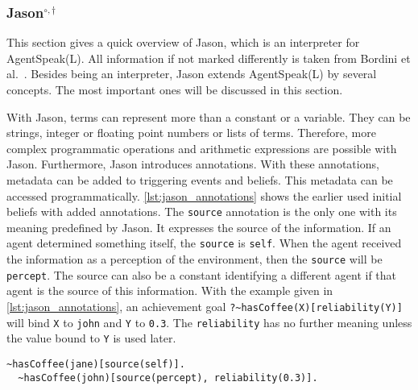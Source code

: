 \subsubsection[Jason]{Jason$^{\circ,\dagger}$}\label{fun:apl_jason}
This section gives a quick overview of Jason, which is an interpreter for AgentSpeak(L).
All information if not marked differently is taken from Bordini et al.~\cite{bordini_jason_2005}.
Besides being an interpreter, Jason extends AgentSpeak(L) by several concepts.
The most important ones will be discussed in this section.

With Jason, terms can represent more than a constant or a variable.
They can be strings, integer or floating point numbers or lists of terms.
Therefore, more complex programmatic operations and arithmetic expressions are possible with Jason.
Furthermore, Jason introduces annotations.
With these annotations, metadata can be added to triggering events and beliefs.
This metadata can be accessed programmatically.
\autoref{lst:jason_annotations} shows the earlier used initial beliefs with added annotations.
The \texttt{source} annotation is the only one with its meaning predefined by Jason.
It expresses the source of the information.
If an agent determined something itself, the \texttt{source} is \texttt{self}.
When the agent received the information as a perception of the environment, then the \texttt{source} will be \texttt{percept}.
The source can also be a constant identifying a different agent if that agent is the source of this information.
With the example given in \autoref{lst:jason_annotations}, an achievement goal \texttt{?\~{}hasCoffee(X)[reliability(Y)]} will bind \texttt{X} to \texttt{john} and \texttt{Y} to \texttt{0.3}.
The \texttt{reliability} has no further meaning unless the value bound to \texttt{Y} is used later.
\begin{lstlisting}[caption={Annotation of beliefs in Jason.}, label=lst:jason_annotations]
  ~hasCoffee(jane)[source(self)].
  ~hasCoffee(john)[source(percept), reliability(0.3)].
\end{lstlisting}

